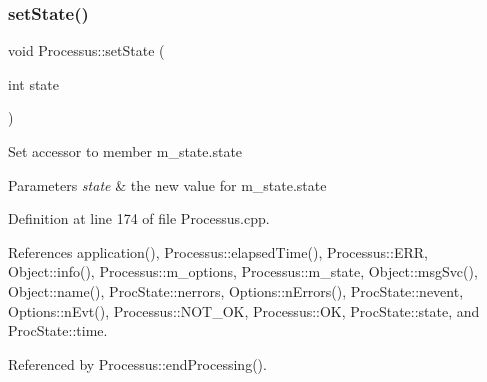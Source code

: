 \subsubsection{\texorpdfstring{set\+State()}{setState()}}
{\footnotesize\ttfamily void Processus\+::set\+State (\begin{DoxyParamCaption}\item[{int}]{state }\end{DoxyParamCaption})\hspace{0.3cm}{\ttfamily [inherited]}}

Set accessor to member m\+\_\+state.\+state 
\begin{DoxyParams}{Parameters}
{\em state} & the new value for m\+\_\+state.\+state \\
\hline
\end{DoxyParams}


Definition at line 174 of file Processus.\+cpp.



References application(), Processus\+::elapsed\+Time(), Processus\+::\+E\+RR, Object\+::info(), Processus\+::m\+\_\+options, Processus\+::m\+\_\+state, Object\+::msg\+Svc(), Object\+::name(), Proc\+State\+::nerrors, Options\+::n\+Errors(), Proc\+State\+::nevent, Options\+::n\+Evt(), Processus\+::\+N\+O\+T\+\_\+\+OK, Processus\+::\+OK, Proc\+State\+::state, and Proc\+State\+::time.



Referenced by Processus\+::end\+Processing().


